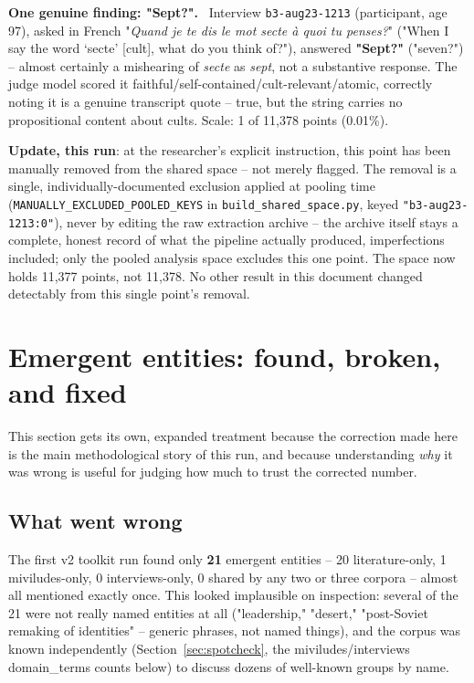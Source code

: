 \documentclass[11pt,a4paper]{article}
\newenvironment{plainbox}[1][Note]
  {\par\vspace{6pt}\noindent{\color{noteline}\rule{\linewidth}{0.6pt}}\par\vspace{3pt}
   \noindent\small\textbf{#1.}\ \ignorespaces}
  {\par\vspace{3pt}\noindent{\color{noteline}\rule{\linewidth}{0.6pt}}\vspace{6pt}\par}
\begin{document}
\begin{plainbox}[One genuine finding: "Sept?"]
Interview \texttt{b3-aug23-1213} (participant, age 97), asked in French
"\emph{Quand je te dis le mot secte à quoi tu penses?}" ("When I say the
word `secte' [cult], what do you think of?"), answered \textbf{"Sept?"}
("seven?") -- almost certainly a mishearing of \emph{secte} as
\emph{sept}, not a substantive response. The judge model scored it
faithful/self-contained/cult-relevant/atomic, correctly noting it is a
genuine transcript quote -- true, but the string carries no propositional
content about cults. Scale: 1 of 11,378 points (0.01\%).

\textbf{Update, this run}: at the researcher's explicit instruction, this
point has been manually removed from the shared space -- not merely
flagged. The removal is a single, individually-documented exclusion
applied at pooling time (\texttt{MANUALLY\_EXCLUDED\_POOLED\_KEYS} in
\texttt{build\_shared\_space.py}, keyed \texttt{"b3-aug23-1213:0"}), never
by editing the raw extraction archive -- the archive itself stays a
complete, honest record of what the pipeline actually produced,
imperfections included; only the pooled analysis space excludes this one
point. The space now holds 11,377 points, not 11,378. No other result in
this document changed detectably from this single point's removal.
\end{plainbox}

\section{Emergent entities: found, broken, and fixed}
\label{sec:entities}

This section gets its own, expanded treatment because the correction
made here is the main methodological story of this run, and because
understanding \emph{why} it was wrong is useful for judging how much to
trust the corrected number.

\subsection{What went wrong}

The first v2 toolkit run found only \textbf{21} emergent entities --
20 literature-only, 1 miviludes-only, 0 interviews-only, 0 shared by any
two or three corpora -- almost all mentioned exactly once. This looked
implausible on inspection: several of the 21 were not really named
entities at all ("leadership," "desert," "post-Soviet remaking of
identities" -- generic phrases, not named things), and the corpus was
known independently (Section~\ref{sec:spotcheck}, the miviludes/interviews
domain\_terms counts below) to discuss dozens of well-known groups by
name.
\end{document}
